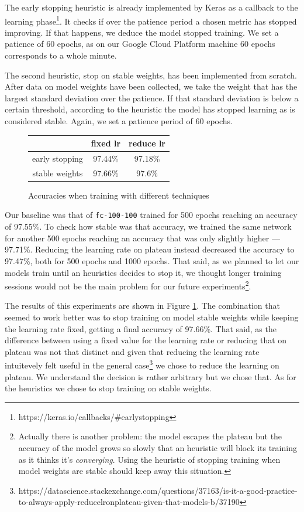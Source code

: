 The early stopping heuristic is already implemented by Keras as a callback to the
learning phase\footnote{https://keras.io/callbacks/\#earlystopping}. It
checks if over the patience period a chosen metric has stopped improving. If
that happens, we deduce the model stopped training. We set a patience of
60 epochs, as on our Google Cloud Platform machine 60 epochs corresponds
to a whole minute.

The second heuristic, stop on stable weights, has been implemented from
scratch. After data on model weights have been collected, we take the
weight that has the largest standard deviation over the patience. If
that standard deviation is below a certain threshold, according to the
heuristic the model has stopped learning as is considered stable.
Again, we set a patience period of 60 epochs.

\begin{figure}
  \centering
  \begin{tabular}{|c|c|c|}
    \hline
    & fixed lr & reduce lr \\
    \hline
    early stopping & 97.44\% & 97.18\% \\
    \hline
    stable weights & 97.66\% & 97.6\% \\
    \hline
  \end{tabular}
  \caption{Accuracies when training with different techniques}
  \label{fig:accuracy-heuristics}
\end{figure}

Our baseline was that of \texttt{fc-100-100} trained for 500 epochs
reaching an accuracy of 97.55\%. To check how stable was that accuracy,
we trained the same network for another 500 epochs reaching an accuracy
that was only slightly higher --- 97.71\%. Reducing the learning rate
on plateau instead decreased the accuracy to 97.47\%, both for 500
epochs and 1000 epochs. That said, as we planned to let our models
train until an heuristics decides to stop it, we thought longer training
sessions would not be the main problem for our future
experiments\footnote{Actually there is another problem: the model
  escapes the plateau but the accuracy of the model grows so slowly
  that an heuristic will block its training as it thinks it's
  \emph{converging}. Using the heuristic of stopping training when
  model weights are stable should keep away this situation.}.

The results of this experiments are shown in Figure \ref{fig:accuracy-heuristics}. The
combination that seemed to work better was to stop training on model
stable weights while keeping the learning rate fixed, getting a final
accuracy of 97.66\%. That said, as the difference between using a fixed
value for the learning rate or reducing that on plateau was not that
distinct and given that reducing the learning rate intuitevely felt
useful in the general
case\footnote{https://datascience.stackexchange.com/questions/37163/is-it-a-good-practice-to-always-apply-reducelronplateau-given-that-models-b/37190}
we chose to reduce the learning on plateau. We understand the decision
is rather arbitrary but we chose that. As for the heuristics we chose
to stop training on stable weights.

